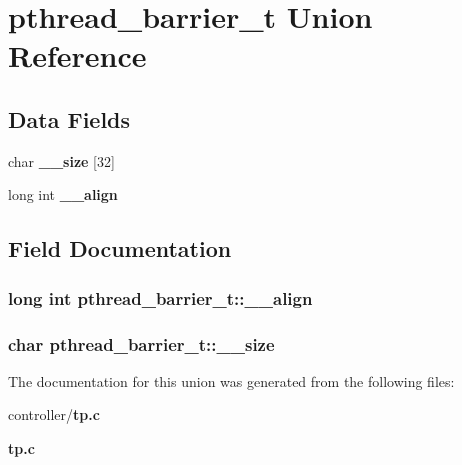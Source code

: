 \section{pthread\_\-barrier\_\-t Union Reference}
\label{unionpthread__barrier__t}
\subsection*{Data Fields}
\begin{DoxyCompactItemize}
\item 
char {\bf \_\-\_\-size} [32]
\item 
long int {\bf \_\-\_\-align}
\end{DoxyCompactItemize}


\subsection{Field Documentation}
\subsubsection[{\_\-\_\-align}]{\setlength{\rightskip}{0pt plus 5cm}long int {\bf pthread\_\-barrier\_\-t::\_\-\_\-align}}\label{unionpthread__barrier__t_ae0c9b4ddfcd303427ba687ec2029e859}
\subsubsection[{\_\-\_\-size}]{\setlength{\rightskip}{0pt plus 5cm}char {\bf pthread\_\-barrier\_\-t::\_\-\_\-size}}\label{unionpthread__barrier__t_a3e8f7bbf281a52c6bae79ef5f76266f3}


The documentation for this union was generated from the following files:\begin{DoxyCompactItemize}
\item 
controller/{\bf tp.c}\item 
{\bf tp.c}\end{DoxyCompactItemize}
